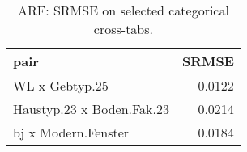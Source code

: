 \begin{table}[ht]
\centering
\begin{tabular}{lr}
  \hline
pair & SRMSE \\ 
  \hline
WL x Gebtyp.25 & 0.0122 \\ 
  Haustyp.23 x Boden.Fak.23 & 0.0214 \\ 
  bj x Modern.Fenster & 0.0184 \\ 
   \hline
\end{tabular}
\caption{ARF: SRMSE on selected categorical cross-tabs.} 
\label{tab:arf:srmse}
\end{table}
